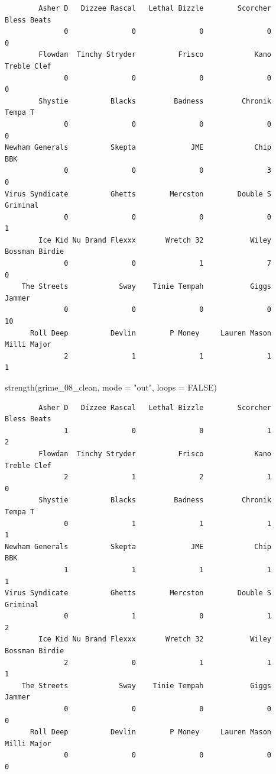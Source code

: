 \documentclass[
  letterpaper,
  DIV=11,
  numbers=noendperiod]{scrreprt}
\newenvironment{Shaded}{\begin{snugshade}}{\end{snugshade}}
\newcommand{\AttributeTok}[1]{\textcolor[rgb]{0.40,0.45,0.13}{#1}}
\newcommand{\ConstantTok}[1]{\textcolor[rgb]{0.56,0.35,0.01}{#1}}
\newcommand{\FunctionTok}[1]{\textcolor[rgb]{0.28,0.35,0.67}{#1}}
\newcommand{\NormalTok}[1]{\textcolor[rgb]{0.00,0.23,0.31}{#1}}
\newcommand{\StringTok}[1]{\textcolor[rgb]{0.13,0.47,0.30}{#1}}
\begin{document}
\begin{verbatim}
        Asher D   Dizzee Rascal   Lethal Bizzle        Scorcher     Bless Beats 
              0               0               0               0               0 
        Flowdan  Tinchy Stryder          Frisco            Kano     Treble Clef 
              0               0               0               0               0 
        Shystie          Blacks         Badness         Chronik         Tempa T 
              0               0               0               0               0 
Newham Generals          Skepta             JME            Chip             BBK 
              0               0               0               3               0 
Virus Syndicate          Ghetts        Mercston        Double S        Griminal 
              0               0               0               0               1 
        Ice Kid Nu Brand Flexxx       Wretch 32           Wiley  Bossman Birdie 
              0               0               1               7               0 
    The Streets            Sway    Tinie Tempah           Giggs          Jammer 
              0               0               0               0              10 
      Roll Deep          Devlin        P Money     Lauren Mason     Milli Major 
              2               1               1               1               1 
\end{verbatim}

\begin{Shaded}
\begin{Highlighting}[]
\FunctionTok{strength}\NormalTok{(grime\_08\_clean, }\AttributeTok{mode =} \StringTok{"out"}\NormalTok{, }\AttributeTok{loops =} \ConstantTok{FALSE}\NormalTok{)}
\end{Highlighting}
\end{Shaded}

\begin{verbatim}
        Asher D   Dizzee Rascal   Lethal Bizzle        Scorcher     Bless Beats 
              1               0               0               1               2 
        Flowdan  Tinchy Stryder          Frisco            Kano     Treble Clef 
              2               1               2               1               0 
        Shystie          Blacks         Badness         Chronik         Tempa T 
              0               1               1               1               1 
Newham Generals          Skepta             JME            Chip             BBK 
              1               1               1               1               1 
Virus Syndicate          Ghetts        Mercston        Double S        Griminal 
              0               1               0               1               2 
        Ice Kid Nu Brand Flexxx       Wretch 32           Wiley  Bossman Birdie 
              2               0               1               1               1 
    The Streets            Sway    Tinie Tempah           Giggs          Jammer 
              0               0               0               0               0 
      Roll Deep          Devlin        P Money     Lauren Mason     Milli Major 
              0               0               0               0               0 
\end{verbatim}
\end{document}

